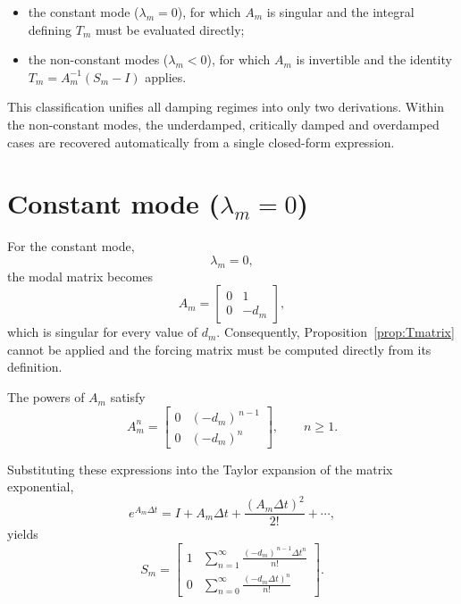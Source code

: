 \documentclass{Configuration_Files/PoliMi3i_thesis}
\begin{document}
\begin{itemize}
\item the constant mode (\(\lambda_m=0\)), for which \(A_m\) is singular and the integral defining \(T_m\) must be evaluated directly;

\item the non-constant modes (\(\lambda_m<0\)), for which \(A_m\) is invertible and the identity \(T_m=A_m^{-1}(S_m-I)\) applies.
\end{itemize}

This classification unifies all damping regimes into only two derivations. Within the non-constant modes, the underdamped, critically damped and overdamped cases are recovered automatically from a single closed-form expression.

\section{Constant mode (\(\lambda_m=0\))}

For the constant mode,
\begin{equation*}
\lambda_m=0,
\end{equation*}
the modal matrix becomes
\begin{equation*}
A_m=
\begin{bmatrix}
0 & 1\\
0 & -d_m
\end{bmatrix},
\end{equation*}
which is singular for every value of \(d_m\). Consequently, Proposition~\ref{prop:Tmatrix} cannot be applied and the forcing matrix must be computed directly from its definition.

The powers of \(A_m\) satisfy
\begin{equation*}
A_m^n
=
\begin{bmatrix}
0 & (-d_m)^{\,n-1}\\
0 & (-d_m)^n
\end{bmatrix},
\qquad
n\ge1.
\end{equation*}

Substituting these expressions into the Taylor expansion of the matrix exponential,
\begin{equation*}
e^{A_m\Delta t}
=
I
+
A_m\Delta t
+
\frac{(A_m\Delta t)^2}{2!}
+\cdots,
\end{equation*}
yields
\begin{equation*}
S_m
=
\begin{bmatrix}
1 &
\displaystyle
\sum_{n=1}^{\infty}
\frac{(-d_m)^{\,n-1}\Delta t^n}{n!}
\\[3ex]
0 &
\displaystyle
\sum_{n=0}^{\infty}
\frac{(-d_m\Delta t)^n}{n!}
\end{bmatrix}.
\end{equation*}
\end{document}
